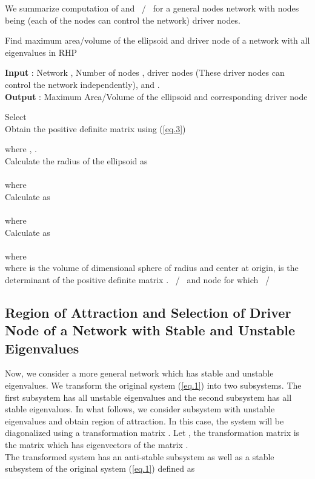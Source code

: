 \documentclass[conference]{IEEEtran}
\begin{document}
   We summarize computation of  and ~/~ for a general  nodes network with  nodes being (each of the nodes can control the network) driver nodes.
   \begin{algorithm}[H]
   \caption{Find maximum area/volume of the ellipsoid and driver node of a network with all eigenvalues in RHP}\label{euclid}
   \textbf{Input} : Network , Number of nodes , driver nodes  (These driver nodes can control the network independently),  and .\\
   \textbf{Output} :  Maximum Area/Volume of the ellipsoid and  corresponding  driver node
   \begin{algorithmic}[1]
   \FOR{}
   \STATE Select  \\
   \STATE Obtain the positive definite matrix  using (\ref{eq.3})
   
   where , . \\
   \STATE Calculate the radius of the ellipsoid  as \\
     \\
    where  \\
   \ENDFOR
   \IF {}
\STATE Calculate  as \\
     \\
    where  \\
   \ELSE
   \STATE Calculate  as \\
    \\
   where  \\
   where  is the volume of dimensional sphere  of radius  and center at origin,  is the determinant of the positive definite matrix .
\ENDIF
   \RETURN{} ~/~ and node  for which  ~/~  
   \end{algorithmic}
   \end{algorithm}
   
 \subsection{Region of Attraction and Selection of Driver Node of a Network with Stable and Unstable Eigenvalues}
 Now, we consider a more general network which has stable and unstable eigenvalues. We transform the original system (\ref{eq.1}) into two subsystems. The first subsystem has all unstable eigenvalues and the second subsystem has all stable eigenvalues. In what follows, we consider subsystem with unstable eigenvalues and obtain region of attraction. In this case, the system will be diagonalized using a transformation matrix . Let , the transformation matrix  is the matrix which has eigenvectors of the matrix . \\
   The transformed system has an anti-stable subsystem as well as a stable subsystem of the original system (\ref{eq.1}) defined as
   
\end{document}
